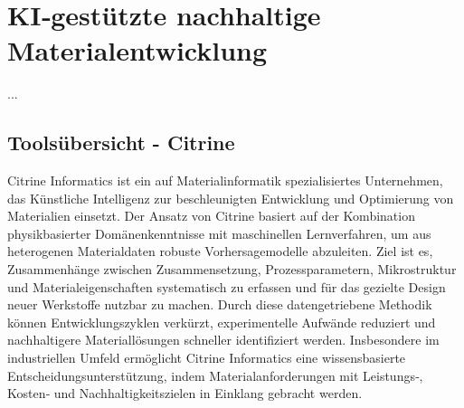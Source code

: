 \chapter{KI‑gestützte nachhaltige Materialentwicklung}
...

\section{Toolsübersicht - Citrine}
Citrine Informatics ist ein auf Materialinformatik spezialisiertes Unternehmen, das Künstliche Intelligenz zur beschleunigten Entwicklung und Optimierung von Materialien einsetzt. Der Ansatz von Citrine basiert auf der Kombination physikbasierter Domänenkenntnisse mit maschinellen Lernverfahren, um aus heterogenen Materialdaten robuste Vorhersagemodelle abzuleiten. Ziel ist es, Zusammenhänge zwischen Zusammensetzung, Prozessparametern, Mikrostruktur und Materialeigenschaften systematisch zu erfassen und für das gezielte Design neuer Werkstoffe nutzbar zu machen. Durch diese datengetriebene Methodik können Entwicklungszyklen verkürzt, experimentelle Aufwände reduziert und nachhaltigere Materiallösungen schneller identifiziert werden. Insbesondere im industriellen Umfeld ermöglicht Citrine Informatics eine wissensbasierte Entscheidungsunterstützung, indem Materialanforderungen mit Leistungs‑, Kosten‑ und Nachhaltigkeitszielen in Einklang gebracht werden. \cite{citrine_informatics_platform_2026}

